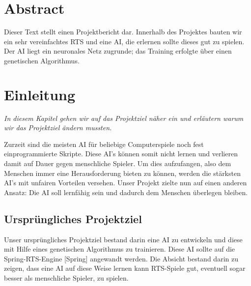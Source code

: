 \documentclass[
	12pt,
	a4paper,
	BCOR10mm,
	DIV14,
	headsepline,
	usegeometry,
]{scrreprt}
\begin{document}
\restoregeometry

\chapter*{Abstract}

\thispagestyle{empty}

Dieser Text stellt einen Projektbericht dar. Innerhalb des Projektes bauten wir ein sehr vereinfachtes RTS und eine AI, die erlernen sollte dieses gut zu spielen. Der AI liegt ein neuronales Netz zugrunde; das Training erfolgte über einen genetischen Algorithmus.

\tableofcontents

\chapter{Einleitung}
\label{Einleitung}

\textit{%
In diesem Kapitel gehen wir auf das Projektziel näher ein und erläutern warum wir das Projektziel ändern mussten.
}

\bigskip

Zurzeit sind die meisten AI für beliebige Computerspiele noch fest einprogrammierte Skripte. Diese AI's können somit nicht lernen und verlieren damit auf Dauer gegen menschliche Spieler. Um dies aufzufangen, also dem Menschen immer eine Herausforderung bieten zu können, werden die stärksten AI's mit unfairen Vorteilen versehen. Unser Projekt zielte nun auf einen anderen Ansatz: Die AI soll lernfähig sein und dadurch dem Menschen überlegen bleiben.

\section{Ursprüngliches Projektziel}

Unser ursprüngliches Projektziel bestand darin eine AI zu entwickeln und diese mit Hilfe eines genetischen Algorithmus zu trainieren. Diese AI sollte auf die Spring-RTS-Engine [Spring] angewandt werden. Die Absicht bestand darin zu zeigen, dass eine AI auf diese Weise lernen kann RTS-Spiele gut, eventuell sogar besser als menschliche Spieler, zu spielen.\\
\end{document}
